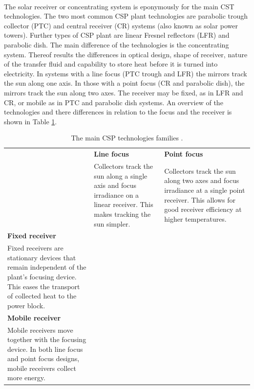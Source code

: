 \documentclass[Master,MEE,english]{twbook}%
\begin{document}
\\
The solar receiver or concentrating system is eponymously for the main CST technologies. The two most common CSP plant technologies are parabolic trough collector (PTC) and central receiver (CR) systems (also known as solar power towers). Further types of CSP plant are linear Fresnel reflectors (LFR) and parabolic dish. The main difference of the technologies is the concentrating system. Thereof results the differences in optical design, shape of receiver, nature of the transfer fluid and capability to store heat before it is turned into electricity. In systems with a line focus (PTC trough and LFR) the mirrors track the sun along one axis. In those with a point focus (CR and parabolic dish), the mirrors track the sun along two axes. The receiver may be fixed, as in LFR and CR, or mobile as in PTC and parabolic dish systems. An overview of the technologies and there differences in relation to the focus and the receiver  is shown in Table \ref{tbl: CSPtech}.
\begin{table}[h!] %
  \centering
  \begin{tabular}{  m{5cm}  m{5cm}  m{5cm}  }
    \hline
    & \textbf{Line focus} & \textbf{Point focus} \\ 
    & Collectors track the sun along a single axis and focus irradiance on a linear receiver. This makes tracking the sun simpler. & Collectors track the sun along two axes and focus irradiance at a single point receiver. This allows for good receiver efficiency at higher temperatures.\\ \hline \hline
    \textbf{Fixed receiver} & &\\
    Fixed receivers are stationary devices that remain independent of the plant’s focusing device. This eases the transport of collected heat to the power block.
    &
    \begin{minipage}[t]{5cm}
      \centering
    \end{minipage}
    & 
    \begin{minipage}[t]{5cm}
      \centering
    \end{minipage}
    \\ \hline
    \textbf{Mobile receiver} & & \\
    Mobile receivers move together with the focusing device. In both line focus and point focus designs, mobile receivers collect more energy.
    &
    \begin{minipage}{5cm}
      \centering
    \end{minipage}
    & 
    \begin{minipage}{5cm}
      \centering
    \end{minipage}    
    \\ \hline
  \end{tabular}
  \caption[The main CSP technologies families.]{The main CSP technologies families \cite{IEA2014b}.}\label{tbl: CSPtech}
\end{table}
\end{document}
